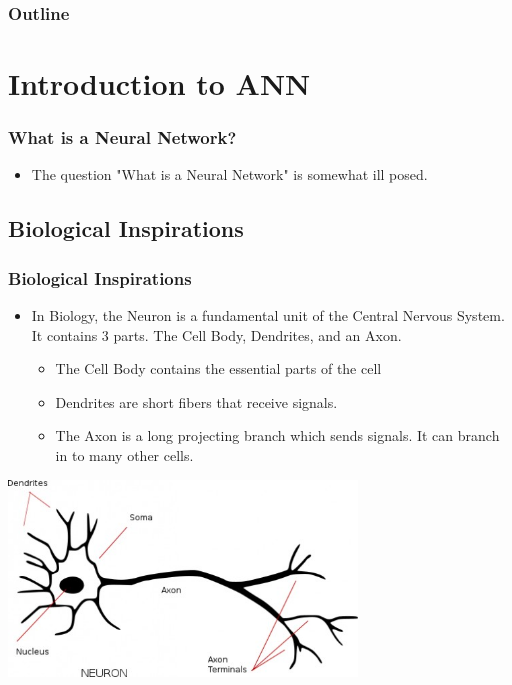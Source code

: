 \documentclass{beamer}
\title[Artifical Neural Networks]
{}
\author[Mitchell Corbett/Matthew Galbraith]{Mitchell Corbett}
\begin{document}
 
 



\expandafter\def\expandafter\insertshorttitle\expandafter{%
  \insertshorttitle\hfill%
  \insertframenumber\,/\,\inserttotalframenumber}

\begin{frame}
  \frametitle{Outline}
  \tableofcontents[pausesections]
\end{frame}

\section{Introduction to ANN}
\begin{frame}
\frametitle{What is a Neural Network?}

\begin{itemize}
	\item The question "What is a Neural Network" is somewhat ill posed.
    
\end{itemize}
\end{frame}
\subsection{Biological Inspirations}
\begin{frame}
\frametitle{Biological Inspirations}
\begin{itemize}
	\item In Biology, the Neuron is a fundamental unit of the Central Nervous System. It contains 3 parts. The Cell Body, Dendrites, and an Axon.
	\begin{itemize}
		\item The Cell Body contains the essential parts of the cell
		\item Dendrites are short fibers that receive signals.
		\item The Axon is a long projecting branch which sends signals. It can branch in to many other cells.
\end{itemize}
\end{itemize}
\end{frame}
\begin{frame}
\includegraphics[width = 350px]{neuron.jpg}
\end{frame}
\end{document}
